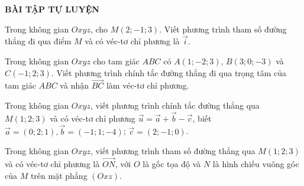 \begin{center}
\textbf{BÀI TẬP TỰ LUYỆN}
\end{center}
\begin{bt}%
Trong không gian $Oxyz$, cho $M(2;-1;3)$. Viết phương trình tham số đường thẳng đi qua điểm $M$ và có véc-tơ chỉ phương là $\vec{i}$.
\end{bt}
\begin{bt}%
Trong không gian $Oxyz$ cho tam giác $ABC$ có $A(1;-2;3)$, $B(3;0;-3)$ và $C(-1;2;3)$. Viết phương trình chính tắc đường thẳng đi qua trọng tâm của tam giác $ABC$ và nhận $\overrightarrow{BC}$ làm véc-tơ chỉ phương.
\end{bt}
\begin{bt}%
	Trong không gian $Oxyz$, viết phương trình chính tắc đường thẳng qua $M(1;2;3)$ và có véc-tơ chỉ phương $\vec{u}=\vec{a}+\vec{b}-\vec {c}$, biết $\vec{a}=\left(0;2;1\right), \vec{b}=\left(-1;1;-4\right)$; $\vec{c}=\left(2;-1;0\right)$.
	\end{bt}
\begin{bt}%
	Trong không gian $Oxyz$, viết phương trình tham số đường thẳng qua $M(1;2;3)$ và có véc-tơ chỉ phương là $\overrightarrow{ON}$, với $O$ là gốc tọa độ và $N$ là hình chiếu vuông góc của $M$ trên mặt phẳng $(Oxz)$.
\end{bt}
